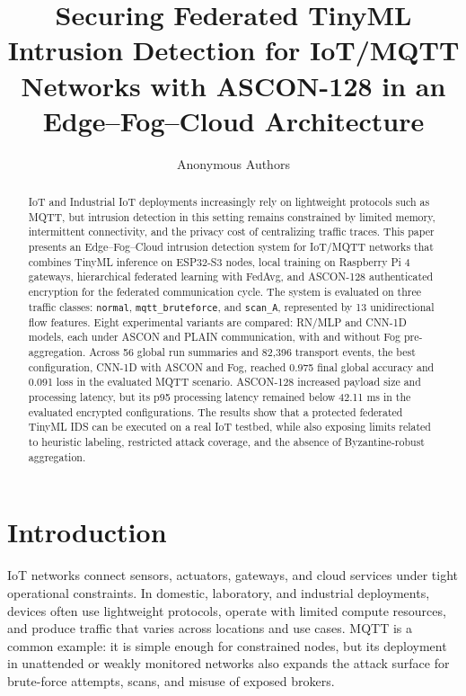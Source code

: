 \documentclass[runningheads]{llncs}
\begin{document}
\title{Securing Federated TinyML Intrusion Detection for IoT/MQTT Networks with ASCON-128 in an Edge--Fog--Cloud Architecture}

\author{Anonymous Authors}

\maketitle

\begin{abstract}
IoT and Industrial IoT deployments increasingly rely on lightweight protocols such as MQTT, but intrusion detection in this setting remains constrained by limited memory, intermittent connectivity, and the privacy cost of centralizing traffic traces. This paper presents an Edge--Fog--Cloud intrusion detection system for IoT/MQTT networks that combines TinyML inference on ESP32-S3 nodes, local training on Raspberry Pi 4 gateways, hierarchical federated learning with FedAvg, and ASCON-128 authenticated encryption for the federated communication cycle. The system is evaluated on three traffic classes: \texttt{normal}, \texttt{mqtt\_bruteforce}, and \texttt{scan\_A}, represented by 13 unidirectional flow features. Eight experimental variants are compared: RN/MLP and CNN-1D models, each under ASCON and PLAIN communication, with and without Fog pre-aggregation. Across 56 global run summaries and 82,396 transport events, the best configuration, CNN-1D with ASCON and Fog, reached 0.975 final global accuracy and 0.091 loss in the evaluated MQTT scenario. ASCON-128 increased payload size and processing latency, but its p95 processing latency remained below 42.11 ms in the evaluated encrypted configurations. The results show that a protected federated TinyML IDS can be executed on a real IoT testbed, while also exposing limits related to heuristic labeling, restricted attack coverage, and the absence of Byzantine-robust aggregation.
\end{abstract}

\section{Introduction}

IoT networks connect sensors, actuators, gateways, and cloud services under tight operational constraints. In domestic, laboratory, and industrial deployments, devices often use lightweight protocols, operate with limited compute resources, and produce traffic that varies across locations and use cases. MQTT is a common example: it is simple enough for constrained nodes, but its deployment in unattended or weakly monitored networks also expands the attack surface for brute-force attempts, scans, and misuse of exposed brokers.
\end{document}

